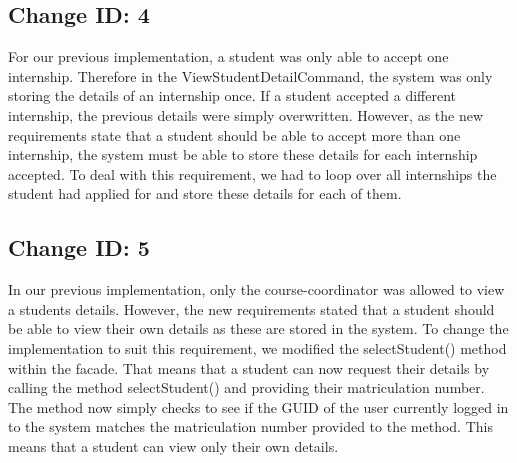 \documentclass{l3deliverable}
\begin{document}
\subsection{Change ID: 4}

For our previous implementation, a student was only able to accept one internship. Therefore in the ViewStudentDetailCommand, the system was only storing the details of an internship once. If a student accepted a different internship, the previous details were simply overwritten. However, as the new requirements state that a student should be able to accept more than one internship, the system must be able to store these details for each internship accepted. 
To deal with this requirement, we had to loop over all internships the student had applied for and store these details for each of them.\\

\subsection{Change ID: 5}

In our previous implementation, only the course-coordinator was allowed to view a students details. However, the new requirements stated that a student should be able to view their own details as these are stored in the system. To change the implementation to suit this requirement, we modified the selectStudent() method within the facade. That means that a student can now request their details by calling the method selectStudent() and providing their matriculation number. The method now simply checks to see if the GUID of the user currently logged in to the system matches the matriculation number provided to the method. This means that a student can view only their own details.\\
\end{document}
